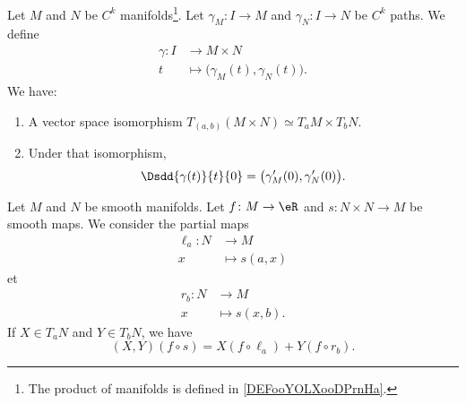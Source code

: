 \begin{lemma}       \label{LEMooTONEooFiysTA}
	Let \( M\) and \( N\) be \( C^k\) manifolds\footnote{The product of manifolds is defined in \ref{DEFooYOLXooDPrnHa}.}. Let \( \gamma_M\colon I\to M\) and \( \gamma_N\colon I\to N\) be \( C^k\) paths. We define
	\begin{equation}
		\begin{aligned}
			\gamma\colon I & \to M\times N                                \\
			t              & \mapsto \big( \gamma_M(t),\gamma_N(t) \big).
		\end{aligned}
	\end{equation}
	We have:
	\begin{enumerate}
		\item
		      A vector space isomorphism \( T_{(a,b)}(M\times N)\simeq T_aM\times T_bN\).
		\item
		      Under that isomorphism,
		      \begin{equation}
			      \Dsdd{ \gamma(t) }{t}{0}=\big( \gamma_M'(0),\gamma_N'(0) \big).
		      \end{equation}
	\end{enumerate}
\end{lemma}

\begin{proposition}	\label{PROPooJIFTooGboJoI}
	Let \( M\) and \( N\) be smooth manifolds. Let \(f \colon M\to \eR  \) and \(s \colon N\times N\to M  \) be smooth maps. We consider the partial maps
	\begin{equation}
		\begin{aligned}
			\ell_a\colon N & \to M          \\
			x              & \mapsto s(a,x)
		\end{aligned}
	\end{equation}
	et
	\begin{equation}
		\begin{aligned}
			r_b\colon N & \to M           \\
			x           & \mapsto s(x,b).
		\end{aligned}
	\end{equation}
	If \( X\in T_aN\) and \( Y\in T_bN\), we have
	\begin{equation}
		(X,Y)(f\circ s)=X(f\circ \ell_a)+Y(f\circ r_b).
	\end{equation}
\end{proposition}



